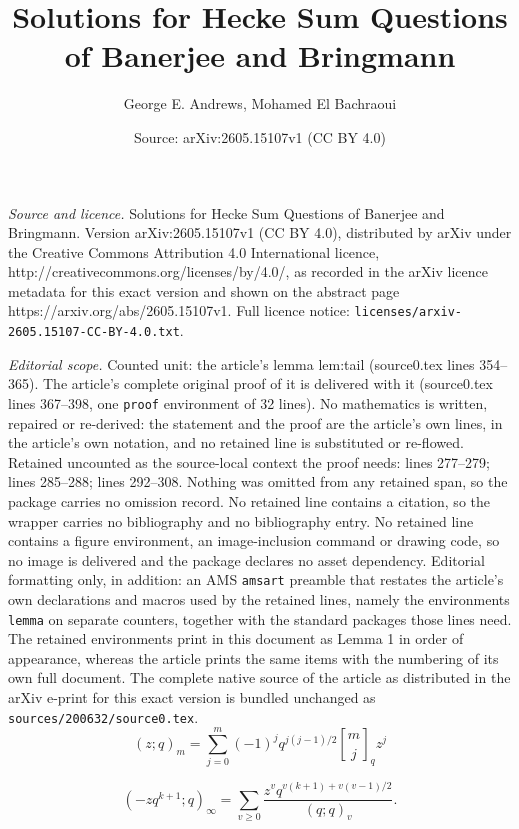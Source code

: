 \documentclass[10pt,a4paper]{amsart}
\title{Solutions for Hecke Sum Questions of Banerjee and Bringmann}
\author{George E. Andrews, Mohamed El Bachraoui}
\date{Source: arXiv:2605.15107v1 (CC BY 4.0)}
\newcommand{\qbinom}[3][]{\genfrac{[}{]}{0pt}{}{#2}{#3}_{#1}}
\begin{document}
\maketitle

\noindent\emph{Source and licence.} Solutions for Hecke Sum Questions of Banerjee and Bringmann. Version arXiv:2605.15107v1 (CC BY 4.0), distributed by arXiv under the Creative Commons Attribution 4.0 International licence, http://creativecommons.org/licenses/by/4.0/, as recorded in the arXiv licence metadata for this exact version and shown on the abstract page https://arxiv.org/abs/2605.15107v1. Full licence notice: \texttt{licenses/arxiv-2605.15107-CC-BY-4.0.txt}.\par\smallskip

\noindent\textit{Editorial scope.} Counted unit: the article's lemma lem:tail (source0.tex lines 354--365). The article's complete original proof of it is delivered with it (source0.tex lines 367--398, one \texttt{proof} environment of 32 lines). No mathematics is written, repaired or re-derived: the statement and the proof are the article's own lines, in the article's own notation, and no retained line is substituted or re-flowed.  Retained uncounted as the source-local context the proof needs: lines 277--279; lines 285--288; lines 292--308.  Nothing was omitted from any retained span, so the package carries no omission record.  No retained line contains a citation, so the wrapper carries no bibliography and no bibliography entry.  No retained line contains a figure environment, an image-inclusion command or drawing code, so no image is delivered and the package declares no asset dependency.  Editorial formatting only, in addition: an AMS \texttt{amsart} preamble that restates the article's own declarations and macros used by the retained lines, namely the environments \texttt{lemma} on separate counters, together with the standard packages those lines need.  The retained environments print in this document as Lemma 1 in order of appearance, whereas the article prints the same items with the numbering of its own full document.  The complete native source of the article as distributed in the arXiv e-print for this exact version is bundled unchanged as \texttt{sources/200632/source0.tex}.
\begin{equation}\label{finite-qbinom}
(z;q)_m=\sum_{j=0}^m(-1)^jq^{j(j-1)/2}\qbinom[q]{m}{j}z^j
\end{equation}

\begin{equation}\label{euler-used}
(-zq^{k+1};q)_\infty
=\sum_{v\ge0}\frac{z^vq^{v(k+1)+v(v-1)/2}}{(q;q)_v}.
\end{equation}
\end{document}
